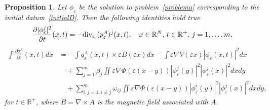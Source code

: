 \documentclass[11pt]{amsart}
\numberwithin{equation}{section}
\newtheorem{proposition}[theorem]{Proposition}
\theoremstyle{definition}
\begin{document}
\begin{proposition}\label{identita}
Let $\phi_{\varepsilon}$ be the solution to problem~\eqref{problema}
corresponding to the initial datum~\eqref{initialD}. Then the
following identities hold true
\begin{equation}
\label{identitafiepsilon} \frac{\partial
|\phi_{\varepsilon}^j|^{2}}{\partial t}(x,t)=-{\rm div}_{x}\,
(p_{\varepsilon}^A)^j(x,t),\quad x\in{{\mathbb R}}^N,\, t\in{{\mathbb R}}^+,\, j=1, \dots, m,
\end{equation}
\begin{equation}\label{identitamomento}
\begin{aligned}
\int \frac{\partial q^A_{\varepsilon}}{\partial t}(x,t)dx & = -\int
q_{\varepsilon}^A(x,t)\times {\varepsilon} B({\varepsilon} x)dx -\int {\varepsilon}\nabla
V({\varepsilon} x)|\phi_{\varepsilon}(x,t)|^{2}dx\\
&\quad  + \sum_{j=1}^m\beta_j\iint
{\varepsilon}\nabla\Phi({\varepsilon}(x-y))|\phi_{\varepsilon}^j(y)|^2|\phi_{\varepsilon}^j(x)|^2dxdy\\
&\quad  + \sum_{i,j=1, i\neq j}^m\omega_{ij}\iint
{\varepsilon}\nabla\Phi({\varepsilon}(x-y))|\phi_{\varepsilon}^i(y)|^2|\phi_{\varepsilon}^j(x)|^2dxdy,
\end{aligned}
\end{equation}
for $t\in{{\mathbb R}}^+$, where $B=\nabla\times A$ is the magnetic field
associated with $A$.
\end{proposition}
\end{document}
